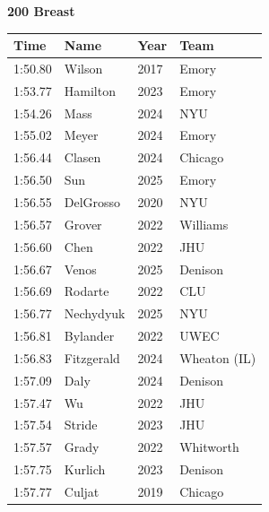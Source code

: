 \noindent\begin{minipage}[t]{0.98\textwidth}
\centering
\textbf{\textcolor{teamprimary}{200 Breast}}\par
\vspace{0.5em}
\centering
\small
\renewcommand{\arraystretch}{1.0}
\setlength{\tabcolsep}{4pt}
\begin{tabular}{@{}p{2.5cm}p{4.5cm}p{1.5cm}p{2.5cm}@{}}
\toprule
\textbf{Time} & \textbf{Name} & \textbf{Year} & \textbf{Team} \\
\midrule
1:50.80 & Wilson & 2017 & Emory \\
1:53.77 & Hamilton & 2023 & Emory \\
1:54.26 & Mass & 2024 & NYU \\
1:55.02 & Meyer & 2024 & Emory \\
1:56.44 & Clasen & 2024 & Chicago \\
1:56.50 & Sun & 2025 & Emory \\
1:56.55 & DelGrosso & 2020 & NYU \\
1:56.57 & Grover & 2022 & Williams \\
1:56.60 & Chen & 2022 & JHU \\
1:56.67 & Venos & 2025 & Denison \\
1:56.69 & Rodarte & 2022 & CLU \\
1:56.77 & Nechydyuk & 2025 & NYU \\
1:56.81 & Bylander & 2022 & UWEC \\
1:56.83 & Fitzgerald & 2024 & Wheaton (IL) \\
1:57.09 & Daly & 2024 & Denison \\
1:57.47 & Wu & 2022 & JHU \\
1:57.54 & Stride & 2023 & JHU \\
1:57.57 & Grady & 2022 & Whitworth \\
1:57.75 & Kurlich & 2023 & Denison \\
1:57.77 & Culjat & 2019 & Chicago \\
\bottomrule
\end{tabular}
\end{minipage}
\vspace{1.2em}
